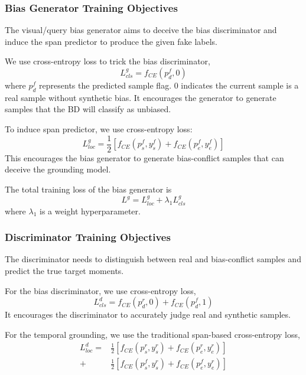 \subsubsection{Bias Generator Training Objectives}
The visual/query bias generator aims to deceive the bias discriminator and induce the span predictor to produce the given fake labels.

We use cross-entropy loss to trick the bias discriminator,
\begin{equation}
	L_{cls}^g=f_{CE}(p_{d}^f, 0)
	\label{g_loss_cls}
\end{equation}
where $p_d^f$ represents the predicted sample flag. $0$ indicates the current sample is a real sample without synthetic bias. It encourages the generator to generate samples that the BD will classify as unbiased. 

To induce span predictor, we use cross-entropy loss:
\begin{equation}
	L_{loc}^g=\frac{1}{2}\left[f_{CE}\left(p_{s}^{f}, y_{s}^{f}\right)+f_{CE}\left(p_{e}^{f}, y_{e}^{f}\right)\right]
	\label{g_loss_loc}
\end{equation}
This encourages the bias generator to generate bias-conflict samples that can deceive the grounding model.

The total training loss of the bias generator is
\begin{equation}
	L^{g}=L_{loc}^g+\lambda_{1} L_{cls}^g
	\label{g_loss}
\end{equation}
where $\lambda_{1}$ is a weight hyperparameter.


\subsubsection{Discriminator Training Objectives}
The discriminator needs to distinguish between real and bias-conflict samples and predict the true target moments.

For the bias discriminator, we use cross-entropy loss,
\begin{equation}
	L_{cls}^d=f_{CE}(p_{d}^r, 0) + f_{CE}(p_{d}^f, 1)
	\label{d_loss_cls}
\end{equation}
It encourages the discriminator to accurately judge real and synthetic samples.

For the temporal grounding, we use the traditional span-based cross-entropy loss,
\begin{equation}
	\begin{split}
		L_{loc}^d =&\frac{1}{2}\left[f_{CE}\left(p_{s}^{r}, y_{s}^{r}\right)+f_{CE}\left(p_{e}^{r}, y_{e}^{r}\right)\right]\\
		+& \frac{1}{2}\left[f_{CE}\left(p_{s}^{f}, y_{s}^{r}\right)+f_{CE}\left(p_{e}^{f}, y_{e}^{r}\right)\right]\\
	\end{split}
	\label{d_loss_loc}
\end{equation}

